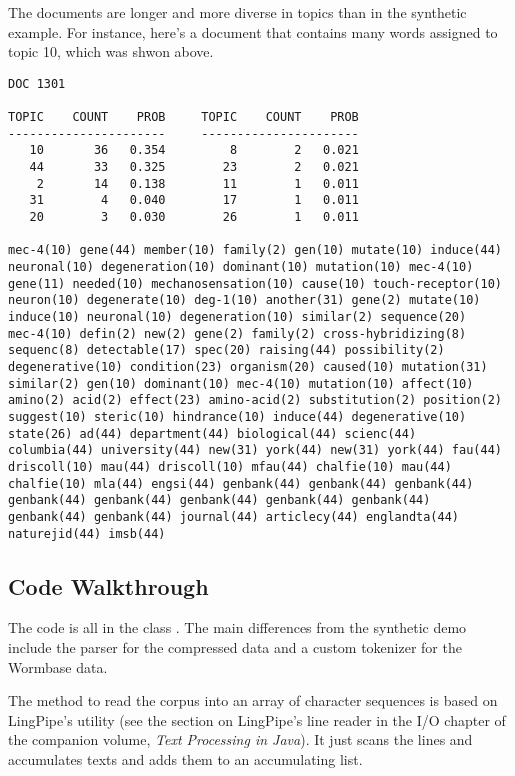 The documents are longer and more diverse in topics than in the synthetic
example.  For instance, here's a document that contains many words assigned
to topic 10, which was shwon above.
%
{\small
\begin{verbatim}
DOC 1301

TOPIC    COUNT    PROB     TOPIC    COUNT    PROB
----------------------     ----------------------
   10       36   0.354         8        2   0.021
   44       33   0.325        23        2   0.021
    2       14   0.138        11        1   0.011
   31        4   0.040        17        1   0.011
   20        3   0.030        26        1   0.011

mec-4(10) gene(44) member(10) family(2) gen(10) mutate(10) induce(44)
neuronal(10) degeneration(10) dominant(10) mutation(10) mec-4(10)
gene(11) needed(10) mechanosensation(10) cause(10) touch-receptor(10)
neuron(10) degenerate(10) deg-1(10) another(31) gene(2) mutate(10)
induce(10) neuronal(10) degeneration(10) similar(2) sequence(20)
mec-4(10) defin(2) new(2) gene(2) family(2) cross-hybridizing(8)
sequenc(8) detectable(17) spec(20) raising(44) possibility(2)
degenerative(10) condition(23) organism(20) caused(10) mutation(31)
similar(2) gen(10) dominant(10) mec-4(10) mutation(10) affect(10)
amino(2) acid(2) effect(23) amino-acid(2) substitution(2) position(2)
suggest(10) steric(10) hindrance(10) induce(44) degenerative(10)
state(26) ad(44) department(44) biological(44) scienc(44)
columbia(44) university(44) new(31) york(44) new(31) york(44) fau(44)
driscoll(10) mau(44) driscoll(10) mfau(44) chalfie(10) mau(44)
chalfie(10) mla(44) engsi(44) genbank(44) genbank(44) genbank(44)
genbank(44) genbank(44) genbank(44) genbank(44) genbank(44)
genbank(44) genbank(44) journal(44) articlecy(44) englandta(44)
naturejid(44) imsb(44)
\end{verbatim}}

\subsection{Code Walkthrough}\label{section:lda-worm-code}

The code is all in the class .  The main differences
from the synthetic demo include the parser for the compressed data and
a custom tokenizer for the Wormbase data.  

The method to read the corpus into an array of character sequences is
based on LingPipe's  utility (see the section on
LingPipe's line reader in the I/O chapter of the companion volume,
{\it Text Processing in Java}).  It just scans the lines and
accumulates texts and adds them to an accumulating list.

